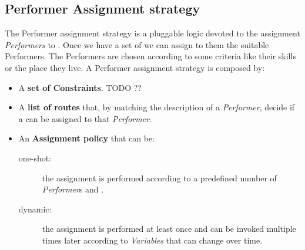 \subsection{Performer Assignment strategy}
The Performer assignment strategy is a pluggable logic devoted to the assignment
\emph{Performers} to \utask{}. Once we have a set of \utask{} we can assign to
them the suitable Performers. The Performers are chosen according to some
criteria like their skills or the place they live. A Performer assignment
strategy is composed by:
\begin{itemize}
    \item A \textbf{set of Constraints}. TODO ??

    \item A \textbf{list of routes} that, by matching the description of a
    \emph{Performer}, decide if a \utask{} can be assigned to that \emph{Performer}.

    \item An \textbf{Assignment policy} that can be:
        \begin{description}
            \item[one-shot:] the assignment is performed according to a predefined
            number of \emph{Performer}s and \utask{}.
            \item[dynamic:] the assignment is performed at least once and can be
            invoked multiple times later according to \emph{Variables} that can
            change over time.
        \end{description}
\end{itemize}



